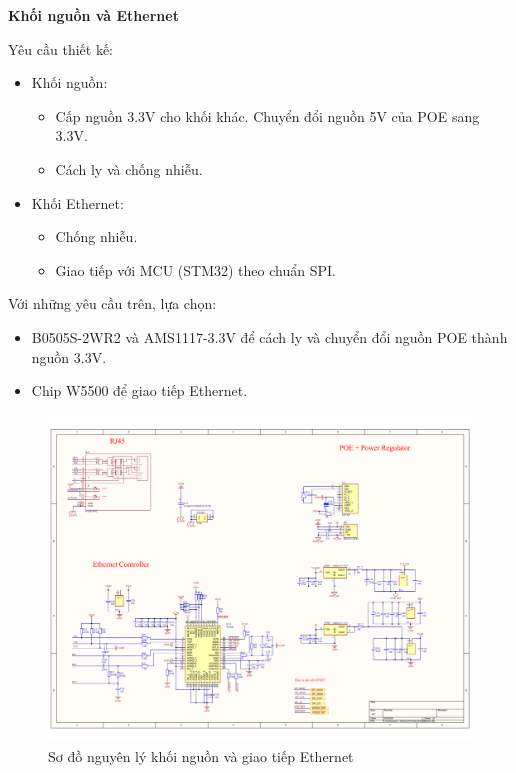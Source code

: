 \textbf{Khối nguồn và Ethernet}

Yêu cầu thiết kế: 

\begin{itemize}
    \item Khối nguồn: 
    
    \begin{itemize}
        \item Cấp nguồn 3.3V cho khối khác. Chuyển đổi nguồn 5V của POE sang 3.3V.
        \item Cách ly và chống nhiễu.
    \end{itemize}

    \item Khối Ethernet:
    \begin{itemize}
        \item Chống nhiễu.
        \item Giao tiếp với MCU (STM32) theo chuẩn SPI.
    \end{itemize}
\end{itemize}

Với những yêu cầu trên, lựa chọn:

\begin{itemize}
    \item B0505S-2WR2 và AMS1117-3.3V để cách ly và chuyển đổi nguồn POE thành nguồn 3.3V.
    \item Chip W5500 để giao tiếp Ethernet.
\end{itemize}

\begin{figure}[!ht]
    \centering
    \includegraphics[width=1.0\linewidth]{Figures/Chap3_Power-and-Ethernet-block-principle.pdf}
    \caption{Sơ đồ nguyên lý khối nguồn và giao tiếp Ethernet}
    \label{fig:hinh3.7}
\end{figure}

